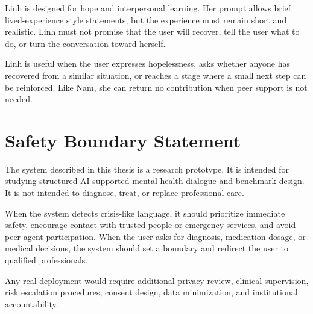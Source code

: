 Linh is designed for hope and interpersonal learning. Her prompt allows brief lived-experience style statements, but the experience must remain short and realistic. Linh must not promise that the user will recover, tell the user what to do, or turn the conversation toward herself.

Linh is useful when the user expresses hopelessness, asks whether anyone has recovered from a similar situation, or reaches a stage where a small next step can be reinforced. Like Nam, she can return no contribution when peer support is not needed.

\section{Safety Boundary Statement}

The system described in this thesis is a research prototype. It is intended for studying structured AI-supported mental-health dialogue and benchmark design. It is not intended to diagnose, treat, or replace professional care.

When the system detects crisis-like language, it should prioritize immediate safety, encourage contact with trusted people or emergency services, and avoid peer-agent participation. When the user asks for diagnosis, medication dosage, or medical decisions, the system should set a boundary and redirect the user to qualified professionals.

Any real deployment would require additional privacy review, clinical supervision, risk escalation procedures, consent design, data minimization, and institutional accountability.
